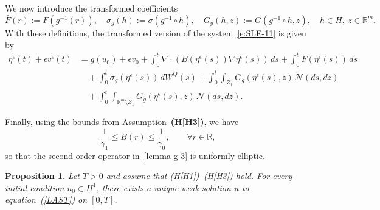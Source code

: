 \documentclass[11pt]{article}
\theoremstyle{plain}
\newtheorem{proposition}[theorem]{Proposition}
\numberwithin{equation}{section}
\begin{document}
\medskip
We now introduce the transformed coefficients
\begin{equation}
\bar{F}(r) := F(g^{-1}(r)), \quad 
\sigma_g(h) := \sigma(g^{-1} \circ h), \quad 
G_g(h,z) := G(g^{-1} \circ h, z), \quad h \in H,~ z\in \mathbb{R}^m.
\end{equation}
With these definitions, the transformed version of the system~\eqref{e:SLE-11} is given by
\begin{align}\label{lemma-g-3}
\eta^\epsilon(t) + \epsilon   v^\epsilon(t) 
&= g(u_0) + \epsilon v_0 
+ \int_0^t \nabla \cdot \left( B(\eta^\epsilon(s)) \nabla \eta^\epsilon(s) \right)\,ds 
+ \int_0^t \bar{F}(\eta^\epsilon(s))\,ds \nonumber \\
&\quad + \int_0^t \sigma_g(\eta^\epsilon(s))\,dW^Q(s)
+ \int_0^t \int_{Z_1} G_g(\eta^\epsilon(s),z)\,\tilde{{\mathcal N}}(ds,dz) \nonumber \\
&\quad + \int_0^t \int_{\mathbb{R}^m \setminus Z_1} G_g(\eta^\epsilon(s),z)\,{\mathcal N}(ds,dz).
\end{align}

\medskip
Finally, using the bounds from Assumption~\textbf{(H\ref{H3})}, we have
\begin{equation}\label{lemma-Br}
\frac{1}{\gamma_1} \leq B(r) \leq \frac{1}{\gamma_0}, \qquad \forall r \in \mathbb{R},
\end{equation}
so that the second-order operator in~\eqref{lemma-g-3} is uniformly elliptic. 

 
  
 
 
 
 
 
 

\begin{proposition}\label{wellpose--limit-1}
Let $T > 0$ and assume that \textnormal{(H\ref{H1})}--\textnormal{(H\ref{H3})} hold. For every initial condition $u_0 \in H^1$, there exists a unique weak solution $u$ to equation~\textnormal{(\ref{LAST})} on $[0,T]$.
\end{proposition}
\end{document}
